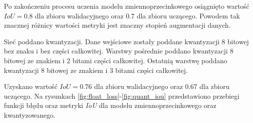 Po zakończeniu procesu uczenia modelu zmiennoprzecinkowego osiągnięto wartość $IoU = 0.8$ dla zbioru walidacyjnego oraz $0.7$ dla zbioru uczącego. 
Powodem tak znacznej różnicy wartości metryki jest znaczny stopień augmentacji danych.

Sieć poddano kwantyzacji. 
Dane wejściowe zostały poddane kwantyzacji 8 bitowej bez znaku i bez części całkowitej.
Warstwy pośrednie poddano kwantyzacji 8 bitowej ze znakiem i 2 bitami części całkowitej.
Ostatnią warstwę poddano kwantyzacji 8 bitowej ze znakiem i 3 bitami części całkowitej.

Uzyskano wartość $IoU = 0.76$ dla zbioru walidacyjnego oraz $0.67$ dla zbioru uczącego.
Na rysunkach \ref{fig:float_loss}-\ref{fig:quant_iou} przedstawiono przebiegi funkcji błędu oraz metryki \emph{IoU} dla modelu zmiennoprzecinkowego oraz kwantyzowanego.

